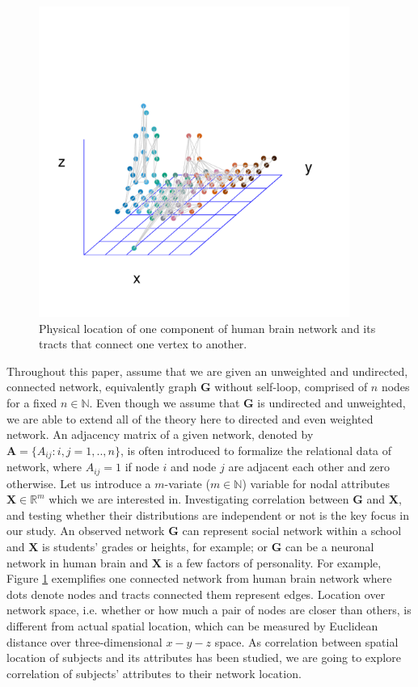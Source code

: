 \documentclass[12pt]{article}
\theoremstyle{definition}
\begin{document}
\begin{figure}[h]
	\centering
	\includegraphics[width=4in]{../Figure/intro.pdf}	
	\caption{Physical location of one component of human brain network and its tracts that connect one vertex to another.}
	\label{fig:intro}
\end{figure}

Throughout this paper, assume that we are given an unweighted and undirected, connected network, equivalently graph $\boldsymbol{G}$ without self-loop, comprised of $n$ nodes for a fixed $n \in \mathbb{N}$. Even though we assume that $\boldsymbol{G}$ is undirected and unweighted, we are able to extend all of the theory here to directed and even weighted network. An adjacency matrix of a given network, denoted by $\boldsymbol{A} = \{A_{ij} : i,j= 1,..,n \}$, is often introduced to formalize the relational data of network, where $A_{ij} = 1$ if node $i$ and node $j$ are adjacent each other and zero otherwise. Let us introduce a $m$-variate ($m \in \mathbb{N}$) variable for nodal attributes $\boldsymbol{X}  \in \mathbb{R}^{m}$ which we are interested in. Investigating correlation between $\boldsymbol{G}$ and $\boldsymbol{X}$, and testing whether their distributions are independent or not is the key focus in our study. An observed network $\mathbf{G}$ can represent social network within a school and $\boldsymbol{X}$ is students' grades or heights, for example; or $\mathbf{G}$ can be a neuronal network in human brain and $\boldsymbol{X}$ is a few factors of personality. For example, Figure \ref{fig:intro} exemplifies one connected network from human brain network where dots denote nodes and tracts connected them represent edges. Location over network space, i.e. whether or how much a pair of nodes are closer than others, is different from actual spatial location, which can be measured by Euclidean distance over three-dimensional $x-y-z$ space. As correlation between spatial location of subjects and its attributes has been studied, we are going to explore correlation of subjects' attributes to their network location. 
	
\end{document}
